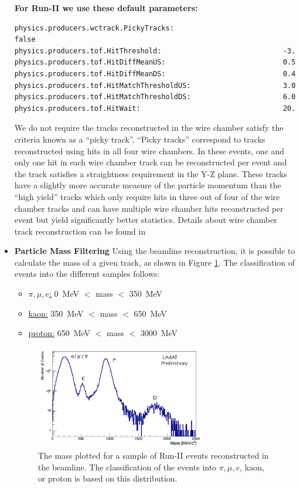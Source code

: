 \begin{itemize}
\textbf{For Run-II we use these default parameters:}
\begin{verbatim} 
physics.producers.wctrack.PickyTracks:                          false
physics.producers.tof.HitThreshold:                             -3.
physics.producers.tof.HitDiffMeanUS:                            0.5  
physics.producers.tof.HitDiffMeanDS:                            0.4  
physics.producers.tof.HitMatchThresholdUS:                      3.0  
physics.producers.tof.HitMatchThresholdDS:                      6.0  
physics.producers.tof.HitWait:                                  20.
\end{verbatim}

We do not require the tracks reconstructed in the wire chamber satisfy the criteria known as a ``picky track''. ``Picky tracks'' correspond to tracks reconstructed using hits in all four wire chambers. In these events, one and only one hit in each wire chamber track can be reconstructed per event and the track satisfies a straightness requirement in the Y-Z plane. These tracks have a slightly more accurate measure of the particle momentum than the ``high yield'' tracks which only require hits in three out of four of the wire chamber tracks and can have multiple wire chamber hits reconstructed per event but yield significantly better statistics. Details about wire chamber track reconstruction can be found in \cite{WCTrackReco}

\item \textbf{Particle Mass Filtering}
Using the beamline reconstruction, it is possible to calculate the mass of a given track, as shown in Figure \ref{fig:mass}. The classification of events into the different samples follows:

\begin{itemize}
\item \underline{$\pi, \mu, e$:} 0~MeV $<$ mass $<$ 350~MeV

\item \underline{kaon:} 350~MeV $<$ mass $<$ 650~MeV

\item \underline{proton:} 650~MeV $<$ mass $<$ 3000~MeV

\end{itemize}

\begin{figure}[htb]
\centering
\includegraphics[width=0.70\textwidth]{images/mass.png}
\caption{The mass plotted for a sample of Run-II events reconstructed in the beamline. The classification of the events into $\pi, \mu, e$, kaon, or proton is based on this distribution.}
\label{fig:mass}
\end{figure}


\end{itemize}
